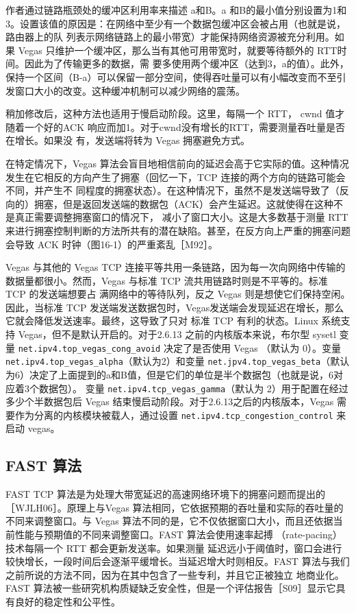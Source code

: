 作者通过链路瓶颈处的缓冲区利用率来描述 a和B。a 和B的最小值分别设置为1和3。设置该值的原因是：在网络中至少有一个数据包缓冲区会被占用（也就是说，路由器上的队
列表示网络链路上的最小带宽）才能保持网络资源被充分利用。如果 Vegas 只维护一个缓冲区，那么当有其他可用带宽时，就要等待额外的 RTT时间。因此为了传输更多的数据，需
要多使用两个缓冲区（达到3，a的值）。此外，保持一个区间（B-a）可以保留一部分空间，使得吞吐量可以有小幅改变而不至引发窗口大小的改变。这种缓冲机制可以减少网络的震荡。

稍加修改后，这种方法也适用于慢启动阶段。这里，每隔一个 RTT， cwnd 值才随着一个好的ACK 响应而加1。对于cwnd没有增长的RTT，需要测量吞吐量是否在增长。如果没
有，发送端将转为 Vegas 拥塞避免方式。

在特定情况下，Vegas 算法会盲目地相信前向的延迟会高于它实际的值。这种情况发生在它相反的方向产生了拥塞（回忆一下，TCP 连接的两个方向的链路可能会不同，并产生不
同程度的拥塞状态）。在这种情况下，虽然不是发送端导致了（反向的）拥塞，但是返回发送端的数据包（ACK）会产生延迟。这就使得在这种不是真正需要调整拥塞窗口的情况下，
减小了窗口大小。这是大多数基于测量 RTT来进行拥塞控制判断的方法所共有的潜在缺陷。甚至，在反方向上严重的拥塞问题会导致 ACK 时钟（图16-1）的严重紊乱［M92］。

Vegas 与其他的 Vegas TCP 连接平等共用一条链路，因为每一次向网络中传输的数据量都很小。然而，Vegas 与标准 TCP 流共用链路时则是不平等的。标准 TCP 的发送端想要占
满网络中的等待队列，反之 Vegas 则是想使它们保持空闲。因此，当标准 TCP 发送端发送数据包时，Vegas发送端会发现延迟在增长，那么它就会降低发送速率。最终，这导致了只对
标准 TCP 有利的状态。Linux 系统支持 Vegas，但不是默认开启的。对于2.6.13 之前的内核版本来说，布尔型 sysetl 变量 \verb|net.ipv4.top_vegas_cong_avoid| 决定了是否使用 Vegas （默认为
0）。变量 \verb|net.ipv4.top_vegas_alpha|（默认为2）和变量 \verb|net.jpv4.top_vegas_beta|（默认为6）决定了上面提到的a和B值，但是它们的单位是半个数据包（也就是说，6对应着3个数据包）。
变量 \verb|net.ipv4.tcp_vegas_gamma|（默认为 2）用于配置在经过多少个半数据包后 Vegas 结束慢启动阶段。对于2.6.13之后的内核版本，Vegas 需要作为分离的内核模块被载人，通过设置
\verb|net.ipv4.tcp_congestion_control| 来启动 vegas。

\subsection{FAST 算法}
FAST TCP 算法是为处理大带宽延迟的高速网络环境下的拥塞问题而提出的［WJLH06］。原理上与Vegas 算法相同，它依据预期的吞吐量和实际的吞吐量的不同来调整窗口。与
Vegas 算法不同的是，它不仅依据窗口大小，而且还依据当前性能与预期值的不同来调整窗口。FAST 算法会使用速率起搏 （rate-pacing）技术每隔一个 RTT 都会更新发送率。如果测量
延迟远小于阈值时，窗口会进行较快增长，一段时间后会逐渐平缓增长。当延迟增大时则相反。FAST 算法与我们之前所说的方法不同，因为在其中包含了一些专利，并且它正被独立
地商业化。FAST 算法被一些研究机构质疑缺乏安全性，但是一个评估报告［S09］显示它具有良好的稳定性和公平性。

